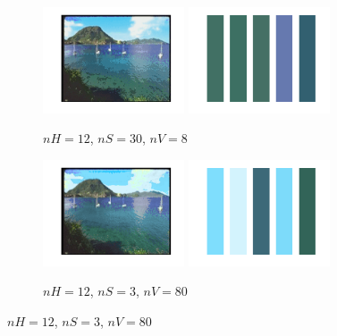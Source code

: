 \documentclass[a4paper]{article}
\begin{document}
\begin{figure}[H]
    \begin{subfigure}[c]{0.8\textwidth}
        \centering
        \includegraphics[width=0.46\textwidth]{images/Paysages67_quantifie_nSx10.png}
        \includegraphics[width=0.46\textwidth]{images/Paysages67_domi_nSx10.png}
        \caption{$nH = 12$, $nS = 30$, $nV = 8$}
        \label{subfig:Paysages67_nSx10}
    \end{subfigure}

    \begin{subfigure}[c]{0.8\textwidth}
        \centering
        \includegraphics[width=0.46\textwidth]{images/Paysages67_quantifie_nVx10.png}
        \includegraphics[width=0.46\textwidth]{images/Paysages67_domi_nVx10.png}
        \caption{$nH = 12$, $nS = 3$, $nV = 80$}
        \label{subfig:Paysages67_nVx10}
    \end{subfigure}


\end{figure}
\end{document}
